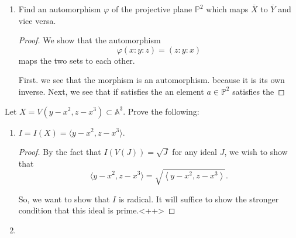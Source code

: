 \documentclass[12pt]{article}
\theoremstyle{definition}
\newenvironment{problem}[2][Problem]{\begin{trivlist}
\item[\hskip \labelsep {\bfseries #1}\hskip \labelsep {\bfseries #2.}]}{\end{trivlist}}
\begin{document}
\begin{problem}{5}
\begin{enumerate}[label=(\alph*)]
\begin{proof}
            \end{proof}
        \item Find an automorphism $\varphi$ of the projective plane $\mathbb P^2$ which maps $\overline X$ to $\overline Y$ and vice versa.
            \begin{proof}
                We show that the automorphism
                \[\varphi(x:y:z) = (z:y:x)\]
                maps the two sets to each other. 
                \par First. we see that the morphism is an automorphism. because it is its own inverse. Next, we see that if  satisfies the an element $a \in \mathbb P^2$ satisfies the 
            \end{proof}
    \end{enumerate}
\end{problem}
\begin{problem}{6}
    Let $X = V(y-x^2, z - x^3) \subset \mathbb A^3$. Prove the following:
    \begin{enumerate}[label=(\alph*)]
        \item $I = I(X)= \langle y - x^2, z -  x^3\rangle $.
            \begin{proof}
                By the fact that $I(V(J)) = \sqrt{J}$ for any ideal $J$, we wish to show that 
                \[\langle  y - x^2, z - x^3\rangle = \sqrt{\left \langle y - x^2, z - x^3 \right\rangle }.\]
                \par So, we want to show that $I$ is radical. It will suffice to show the stronger condition that this ideal is prime.<++>
            \end{proof}
        \item <++>
    \end{enumerate}
\end{problem}
\begin{problem}{7}
    <++>
\end{problem}<++>
\end{document}
